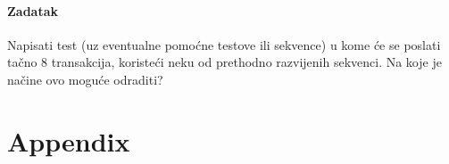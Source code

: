 \paragraph{Zadatak}

Napisati test (uz eventualne pomoćne testove ili sekvence) u kome će se poslati
tačno 8 transakcija, koristeći neku od prethodno razvijenih sekvenci. Na koje je
načine ovo moguće odraditi?


\section{Appendix}

















